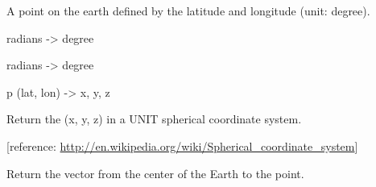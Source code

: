 \documentclass[letterpaper,10pt,english]{sphinxmanual}
\begin{document}
\begin{fulllineitems}
\label{code:pyesg.Point}
A point on the earth defined by the latitude and longitude (unit: degree).

\begin{fulllineitems}
\label{code:pyesg.Point.lat_deg}
radians -\textgreater{} degree

\end{fulllineitems}


\begin{fulllineitems}
\label{code:pyesg.Point.lon_deg}
radians -\textgreater{} degree

\end{fulllineitems}


\begin{fulllineitems}
\label{code:pyesg.Point.spherical_coord}
p (lat, lon) -\textgreater{} x, y, z

Return the (x, y, z) in a UNIT spherical coordinate system.

{[}reference: \href{http://en.wikipedia.org/wiki/Spherical\_coordinate\_system}{http://en.wikipedia.org/wiki/Spherical\_coordinate\_system}{]}

\end{fulllineitems}


\begin{fulllineitems}
\label{code:pyesg.Point.vector}
Return the vector from the center of the Earth to the point.

\end{fulllineitems}


\end{fulllineitems}

\end{document}

